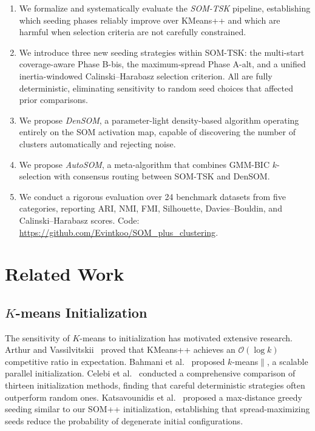 \documentclass[journal]{IEEEtran}
\begin{document}
\begin{enumerate}
\item We formalize and systematically evaluate the \textit{SOM-TSK} pipeline, establishing which seeding phases reliably improve over KMeans++ and which are harmful when selection criteria are not carefully constrained.

\item We introduce three new seeding strategies within SOM-TSK: the multi-start coverage-aware Phase B-bis, the maximum-spread Phase A-alt, and a unified inertia-windowed Calinski--Harabasz selection criterion. All are fully deterministic, eliminating sensitivity to random seed choices that affected prior comparisons.

\item We propose \textit{DenSOM}, a parameter-light density-based algorithm operating entirely on the SOM activation map, capable of discovering the number of clusters automatically and rejecting noise.

\item We propose \textit{AutoSOM}, a meta-algorithm that combines GMM-BIC $k$-selection with consensus routing between SOM-TSK and DenSOM.

\item We conduct a rigorous evaluation over 24 benchmark datasets from five categories, reporting ARI, NMI, FMI, Silhouette, Davies--Bouldin, and Calinski--Harabasz scores. Code: \url{https://github.com/Evintkoo/SOM_plus_clustering}.
\end{enumerate}

\section{Related Work}
\label{sec:related}

\subsection{$K$-means Initialization}

The sensitivity of $K$-means to initialization has motivated extensive research. Arthur and Vassilvitskii~\cite{arthur2007kmeans} proved that KMeans++ achieves an $\mathcal{O}(\log k)$ competitive ratio in expectation. Bahmani et al.~\cite{bahmani2012scalable} proposed $k$-means$\|$, a scalable parallel initialization. Celebi et al.~\cite{celebi2013comparative} conducted a comprehensive comparison of thirteen initialization methods, finding that careful deterministic strategies often outperform random ones. Katsavounidis et al.~\cite{katsavounidis1994new} proposed a max-distance greedy seeding similar to our SOM++ initialization, establishing that spread-maximizing seeds reduce the probability of degenerate initial configurations.
\end{document}
